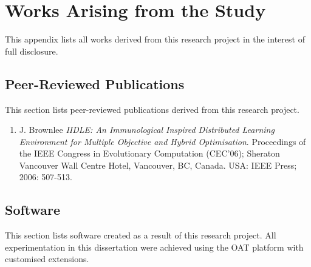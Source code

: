 %
%
\chapter{Works Arising from the Study}
This appendix lists all works derived from this research project in the interest of full disclosure. 

%
%
\section{Peer-Reviewed Publications}
This section lists peer-reviewed publications derived from this research project.

\begin{enumerate}
	\small
	\item J. Brownlee \emph{IIDLE: An Immunological Inspired Distributed Learning Environment for Multiple Objective and Hybrid Optimisation}. Proceedings of the IEEE Congress in Evolutionary Computation (CEC'06); Sheraton Vancouver Wall Centre Hotel, Vancouver, BC, Canada. USA: IEEE Press; 2006: 507-513.
\end{enumerate}	 

\section{Software}
This section lists software created as a result of this research project. All experimentation in this dissertation were achieved using the OAT platform with customised extensions.

